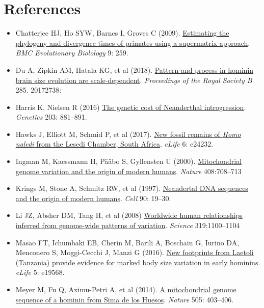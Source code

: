 \documentclass[
]{book}
\begin{document}
\hypertarget{references-14}{%
\section{References}\label{references-14}}

\begin{itemize}
\item
  Chatterjee HJ, Ho SYW, Barnes I, Groves C (2009). \href{https://bmcecolevol.biomedcentral.com/articles/10.1186/1471-2148-9-259}{Estimating the phylogeny and divergence times of primates using a supermatrix approach}. \emph{BMC Evolutionary Biolology} 9: 259.
\item
  Du A, Zipkin AM, Hatala KG, et al (2018). \href{https://doi.org/10.1098/rspb.2017.2738}{Pattern and process in hominin brain size evolution are scale-dependent}. \emph{Proceedings of the Royal Society B} 285. 20172738:
\item
  Harris K, Nielsen R (2016) \href{https://www.genetics.org/content/203/2/881}{The genetic cost of Neanderthal introgression}. \emph{Genetics} 203: 881--891.
\item
  Hawks J, Elliott M, Schmid P, et al (2017). \href{https://doi.org/10.7554/eLife.24232}{New fossil remains of \emph{Homo naledi} from the Lesedi Chamber, South Africa}. \emph{eLife} 6: e24232.
\item
  Ingman M, Kaessmann H, Pääbo S, Gyllensten U (2000). \href{https://www.nature.com/articles/35047064}{Mitochondrial genome variation and the origin of modern humans}. \emph{Nature} 408:708--713
\item
  Krings M, Stone A, Schmitz RW, et al (1997). \href{https://www.cell.com/fulltext/S0092-8674(00)80310-4}{Neandertal DNA sequences and the origin of modern humans}. \emph{Cell} 90: 19--30.
\item
  Li JZ, Absher DM, Tang H, et al (2008) \href{https://www.science.org/doi/10.1126/science.1153717}{Worldwide human relationships inferred from genome-wide patterns of variation}. \emph{Science} 319:1100--1104
\item
  Masao FT, Ichumbaki EB, Cherin M, Barili A, Boschain G, Iurino DA, Menconero S, Moggi-Cecchi J, Manzi G (2016). \href{https://doi.org/10.7554/eLife.19568}{New footprints from Laetoli (Tanzania) provide evidence for marked body size variation in early hominins}. \emph{eLife} 5: e19568.
\item
  Meyer M, Fu Q, Aximu-Petri A, et al (2014). \href{https://www.nature.com/articles/nature12788}{A mitochondrial genome sequence of a hominin from Sima de los Huesos}. \emph{Nature} 505: 403--406.

\end{itemize}
\end{document}
